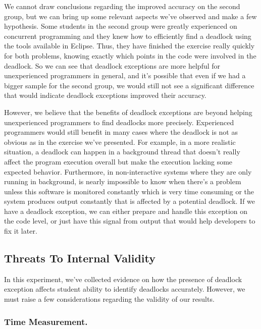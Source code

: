 We cannot draw conclusions regarding the improved accuracy on the second group, but we can bring up some relevant aspects we've observed and make a few hypothesis. Some students in the second group were greatly experienced on concurrent programming and they knew how to efficiently find a deadlock using the tools available in Eclipse. Thus, they have finished the exercise really quickly for both problems, knowing exactly which points in the code were involved in the deadlock. So we can see that deadlock exceptions are more helpful for unexperienced programmers in general, and it's possible that even if we had a bigger sample for the second group, we would still not see a significant difference that would indicate deadlock exceptions improved their accuracy.

However, we believe that the benefits of deadlock exceptions are beyond helping unexperienced programmers to find deadlocks more precisely. Experienced programmers would still benefit in many cases where the deadlock is not as obvious as in the exercise we've presented. For example, in a more realistic situation, a deadlock can happen in a background thread that doesn't really affect the program execution overall but make the execution lacking some expected behavior. Furthermore, in non-interactive systems where they are only running in background, is nearly impossible to know when there's a problem unless this software is monitored constantly which is very time consuming or the system produces output constantly that is affected by a potential deadlock. If we have a deadlock exception, we can either prepare and handle this exception on the code level, or just have this signal from output that would help developers to fix it later.

\subsection{Threats To Internal Validity}

In this experiment, we've collected evidence on how the presence of deadlock exception affects student ability to identify deadlocks accurately. However, we must raise a few considerations regarding the validity of our results.

\subsubsection{Time Measurement.}

